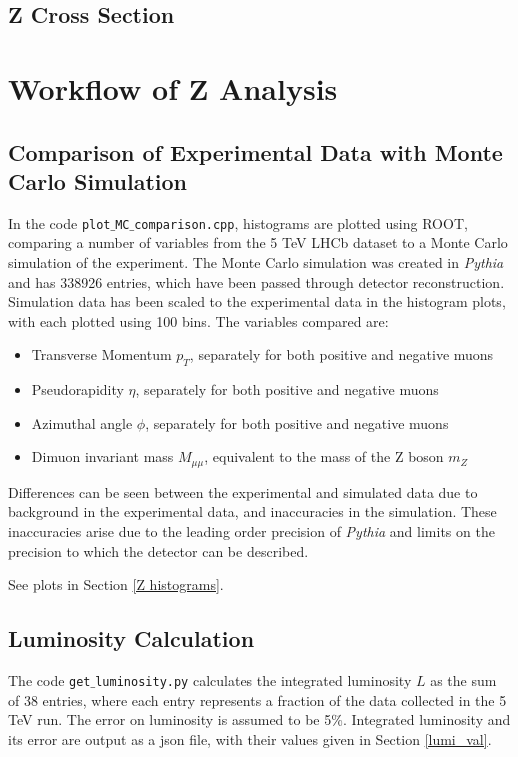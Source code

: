\documentclass[a4paper]{article}
\begin{document}
\subsection{Z Cross Section} \label{xsec_val}



\section{Workflow of Z Analysis} \label{workflow}

\subsection{Comparison of Experimental Data with Monte Carlo Simulation} \label{sec: Z MC comparison}
In the code \texttt{plot$\_$MC$\_$comparison.cpp}, histograms are plotted using ROOT, comparing a number of variables from the 5 TeV LHCb dataset to a Monte Carlo simulation of the experiment. The Monte Carlo simulation was created in \textit{Pythia} and has 338926 entries, which have been passed through detector reconstruction. Simulation data has been scaled to the experimental data in the histogram plots, with each plotted using 100 bins.
The variables compared are:
\begin{itemize}
  \item Transverse Momentum $p_T$, separately for both positive and negative muons
  \item Pseudorapidity $\eta$, separately for both positive and negative muons
  \item Azimuthal angle $\phi$, separately for both positive and negative muons
  \item Dimuon invariant mass $M_{\mu\mu}$, equivalent to the mass of the Z boson $m_Z$
\end{itemize}

Differences can be seen between the experimental and simulated data due to background in the experimental data, and inaccuracies in the simulation. These inaccuracies arise due to the leading order precision of \textit{Pythia} and limits on the precision to which the detector can be described.

See plots in Section \ref{Z histograms}.

\subsection{Luminosity Calculation} \label{sec: Z lumi}
The code \texttt{get$\_$luminosity.py} calculates the integrated luminosity $L$ as the sum of 38 entries, where each entry represents a fraction of the data collected in the 5 TeV run.
The error on luminosity is assumed to be 5$\%$.
Integrated luminosity and its error are output as a json file, with their values given in Section \ref{lumi_val}.
 
\end{document}
